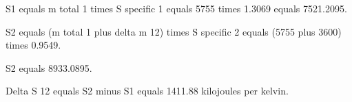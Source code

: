 S1 equals m total 1 times S specific 1 equals 5755 times 1.3069 equals 7521.2095.  

S2 equals (m total 1 plus delta m 12) times S specific 2 equals (5755 plus 3600) times 0.9549.  

S2 equals 8933.0895.  

Delta S 12 equals S2 minus S1 equals 1411.88 kilojoules per kelvin.